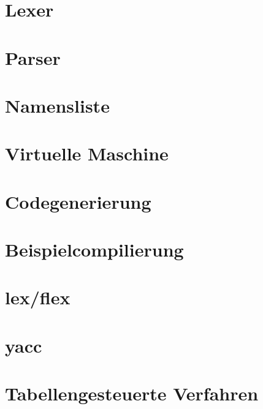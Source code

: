 \documentclass{scrreprt}
\begin{document}
%

\chapter{Lexer}


\chapter{Parser}


\chapter{Namensliste}


\chapter{Virtuelle Maschine}


\chapter{Codegenerierung}


\chapter{Beispielcompilierung}


\chapter{lex/flex}


\chapter{yacc}


\chapter{Tabellengesteuerte Verfahren}

\end{document}
